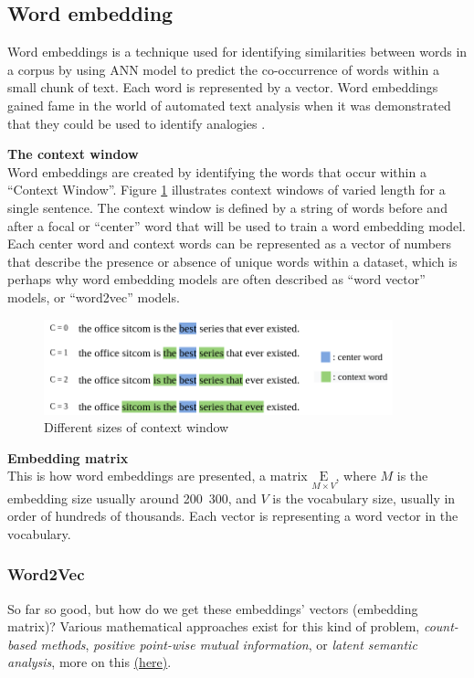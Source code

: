 \subsection{Word embedding}
\label{word_embedding}
Word embeddings is a technique used for identifying similarities between words in a corpus by using ANN model to predict the co-occurrence of words within a small chunk of text. Each word is represented by a vector. Word embeddings gained fame in the world of automated text analysis when it was demonstrated that they could be used to identify analogies \cite{Mikolov}.

\textbf{The context window} \\
Word embeddings are created by identifying the words that occur within a “Context Window”. Figure \ref{fig:context_window} illustrates context windows of varied length for a single sentence. The context window is defined by a string of words before and after a focal or “center” word that will be used to train a word embedding model. Each center word and context words can be represented as a vector of numbers that describe the presence or absence of unique words within a dataset, which is perhaps why word embedding models are often described as “word vector” models, or “word2vec” models.

\begin{figure}[h]
    \centering
    \includegraphics[width=0.9\textwidth]{images/context_window.png}
    \caption{Different sizes of context window}
    \label{fig:context_window}
\end{figure}


\textbf{Embedding matrix}\\
This is how word embeddings are presented, a matrix $\underset{M\times V}{\mathrm{E}}$, where $M$ is the embedding size usually around 200~300, and $V$ is the vocabulary size, usually in order of hundreds of thousands. Each vector is representing a word vector in the vocabulary.



\subsubsection{Word2Vec}
\label{sec:word2vec}
So far so good, but how do we get these embeddings' vectors (embedding matrix)? 
Various mathematical approaches exist for this kind of problem, \emph{count-based methods}, \emph{positive point-wise mutual information}, or \emph{latent semantic analysis}, more on this \href{https://lena-voita.github.io/nlp_course/word_embeddings.html}{(here)}.

